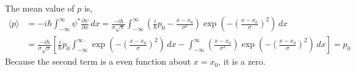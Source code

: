 \documentclass[aps,floatfix,nofootinbib,superscriptaddress,fleqn]{revtex4}
\begin{document}
\begin{itemize}
\begin{align}
    \end{align}
  The mean value of $p$ is,
    \begin{align}
      \langle p \rangle &= -i\hbar \int_{-\infty}^{\infty} \psi^* \frac{\partial \psi}{\partial x}\,dx 
                     = \frac{-i\hbar}{\sigma\sqrt{\pi}}\int_{-\infty}^{\infty} \left(\frac{i}{\hbar}p_0-\frac{x-x_0}{\sigma^2}\right)\exp\left( -{\left(\frac{x-x_0}{\sigma}\right)}^2 \right)\,dx
              \\    &= \frac{-i\hbar}{\sigma\sqrt{\pi}}\left[ \frac{i}{\hbar}p_0\int_{-\infty}^{\infty}\exp\left( -{\left(\frac{x-x_0}{\sigma}\right)}^2 \right)\,dx -\int_{-\infty}^{\infty}\left( \frac{x-x_0}{\sigma^2}\right)\exp\left( -{\left(\frac{x-x_0}{\sigma}\right)}^2 \right)\,dx\right] 
                     = p_0    
    \end{align}
  Because the second term is a even function about $x=x_0$, it is a zero.


\end{itemize}
\end{document}
